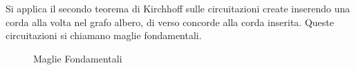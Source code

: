 \documentclass{article}
\numberwithin{equation}{subsection}
\begin{document}
Si applica il secondo teorema di Kirchhoff sulle circuitazioni create inserendo una corda alla volta nel grafo albero, di verso concorde alla corda inserita. Queste 
circuitazioni si chiamano maglie fondamentali. 
\begin{figure}[H]%
    \centering  
    \qquad
    \label{fig:maglia-fondamentale-1-2}
\end{figure}
\begin{figure}[H]%
    \centering  
    \qquad
    \caption{Maglie Fondamentali}%
    \label{fig:maglia-fondamentale-3-4}
\end{figure}
\end{document}
